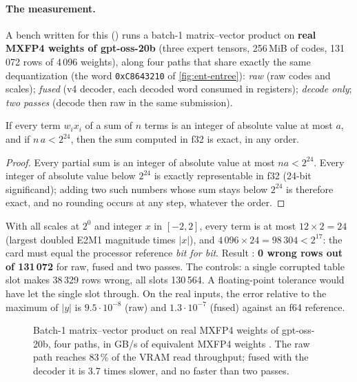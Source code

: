 \paragraph{The measurement.} A bench written for this () runs a batch-1 matrix--vector product on \textbf{real MXFP4 weights of gpt-oss-20b} (three expert tensors, 256\,MiB of codes, 131\,072 rows of 4\,096 weights), along four paths that share exactly the same dequantization (the word \texttt{0xC8643210} of \cref{fig:ent-entree}): \emph{raw} (raw codes and scales); \emph{fused} (v4 decoder, each decoded word consumed in registers); \emph{decode only}; \emph{two passes} (decode then raw in the same submission).

\begin{lemme}\label{lem:ent-exact}
If every term $w_i x_i$ of a sum of $n$ terms is an integer of absolute value at most $a$, and if $n\,a < 2^{24}$, then the sum computed in f32 is exact, in any order.
\end{lemme}

\begin{proof}
Every partial sum is an integer of absolute value at most $n a < 2^{24}$. Every integer of absolute value below $2^{24}$ is exactly representable in f32 (24-bit significand); adding two such numbers whose sum stays below $2^{24}$ is therefore exact, and no rounding occurs at any step, whatever the order.
\end{proof}

With all scales at $2^0$ and integer $x$ in $[-2, 2]$, every term is at most $12 \times 2 = 24$ (largest doubled E2M1 magnitude times $|x|$), and $4\,096 \times 24 = 98\,304 < 2^{17}$: the card must equal the processor reference \emph{bit for bit}. Result \mes: \textbf{0 wrong rows out of 131\,072} for raw, fused and two passes. The controls: a single corrupted table slot makes 38\,329 rows wrong, all slots 130\,564. A floating-point tolerance would have let the single slot through. On the real inputs, the error relative to the maximum of $|y|$ is $9.5\cdot10^{-8}$ (raw) and $1.3\cdot10^{-7}$ (fused) against an f64 reference.

\begin{figure}[ht]
\centering
\GrapheGemvEntropie
\caption[The MXFP4 product, raw, fused with the decoder, or in two passes]{Batch-1 matrix--vector product on real MXFP4 weights of gpt-oss-20b, four paths, in GB/s of equivalent MXFP4 weights \mes. The raw path reaches 83\,\% of the VRAM read throughput; fused with the decoder it is 3.7 times slower, and no faster than two passes.}
\label{fig:ent-gemv}
\end{figure}

